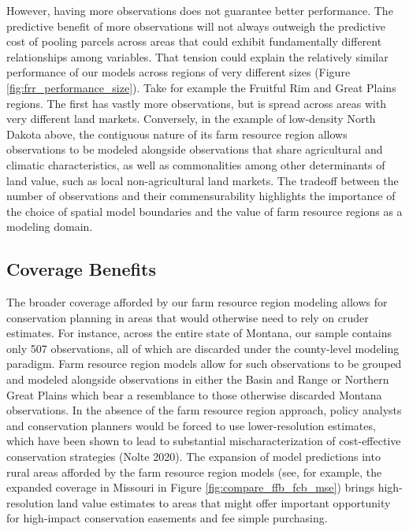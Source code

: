 \documentclass[12pt]{article}
\begin{document}
However, having more observations does not guarantee better performance. The predictive benefit of more observations will not always outweigh the predictive cost of pooling parcels across areas that could exhibit fundamentally different relationships among variables. That tension could explain the relatively similar performance of our models across regions of very different sizes (Figure \ref{fig:frr_performance_size}). Take for example the Fruitful Rim and Great Plains regions. The first has vastly more observations, but is spread across areas with very different land markets. Conversely, in the example of low-density North Dakota above, the contiguous nature of its farm resource region allows observations to be modeled alongside observations that share agricultural and climatic characteristics, as well as commonalities among other determinants of land value, such as local non-agricultural land markets. The tradeoff between the number of observations and their commensurability highlights the importance of the choice of spatial model boundaries and the value of farm resource regions as a modeling domain. 

\subsection{Coverage Benefits}

The broader coverage afforded by our farm resource region modeling allows for conservation planning in areas that would otherwise need to rely on cruder estimates. For instance, across the entire state of Montana, our sample contains only 507 observations, all of which are discarded under the county-level modeling paradigm. Farm resource region models allow for such observations to be grouped and modeled alongside observations in either the Basin and Range or Northern Great Plains which bear a resemblance to those otherwise discarded Montana observations. In the absence of the farm resource region approach, policy analysts and conservation planners would be forced to use lower-resolution estimates, which have been shown to lead to substantial mischaracterization of cost-effective conservation strategies (Nolte 2020). The expansion of model predictions into rural areas afforded by the farm resource region models (see, for example, the expanded coverage in Missouri in Figure \ref{fig:compare_ffb_fcb_mse}) brings high-resolution land value estimates to areas that might offer important opportunity for high-impact conservation easements and fee simple purchasing.
\end{document}
